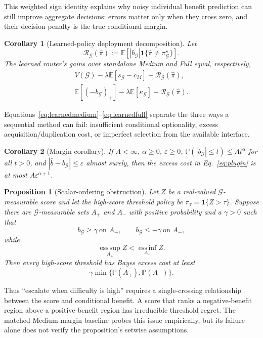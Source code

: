 \documentclass[10pt]{article}
\newtheorem{proposition}{Proposition}
\newtheorem{corollary}{Corollary}
\theoremstyle{definition}
\theoremstyle{remark}
\newcommand{\E}{\mathbb{E}}
\newcommand{\Prb}{\mathbb{P}}
\newcommand{\G}{\mathcal{G}}
\newcommand{\pos}[1]{\left(#1\right)_{+}}
\begin{document}
This weighted sign identity explains why noisy individual benefit prediction
can still improve aggregate decisions: errors matter only when they cross
zero, and their decision penalty is the true conditional margin.

\begin{corollary}[Learned-policy deployment decomposition]
\label{cor:learned}
Let
\[
 \mathcal R_{\G}(\widehat\pi)
 :=\E\!\left[
 |b_{\G}|\mathbf 1\{\widehat\pi\ne\pi^\star_{\G}\}
 \right].
\]
The learned router's gains over standalone Medium and Full equal,
respectively,
\begin{align}
 V(\G)-\lambda\E[s_{\G}-c_M]-\mathcal R_{\G}(\widehat\pi),
 \label{eq:learnedmedium}\\
 \E[\pos{-b_{\G}}]-\lambda\E[\kappa_{\G}]
 -\mathcal R_{\G}(\widehat\pi).
 \label{eq:learnedfull}
\end{align}
\end{corollary}

Equations~\eqref{eq:learnedmedium}--\eqref{eq:learnedfull} separate the three
ways a sequential method can fail: insufficient conditional optionality,
excess acquisition/duplication cost, or imperfect selection from the available
interface.

\begin{corollary}[Margin corollary]
\label{cor:margin}
If $A<\infty$, $\alpha\geq0$, $\varepsilon\geq0$,
$\Prb(|b_{\G}|\le t)\le At^\alpha$ for all $t>0$, and
$|\widehat b-b_{\G}|\le\varepsilon$ almost surely, then the excess cost in
Eq.~\eqref{eq:plugin} is at most $A\varepsilon^{\alpha+1}$.
\end{corollary}

\begin{proposition}[Scalar-ordering obstruction]
\label{prop:threshold}
Let $Z$ be a real-valued $\G$-measurable score and let the high-score
threshold policy be $\pi_\tau=\mathbf 1\{Z>\tau\}$.
Suppose there are $\G$-measurable sets $A_+$ and $A_-$ with positive
probability and a $\gamma>0$ such that
\[
 b_{\G}\geq\gamma\ \text{on }A_+,\qquad
 b_{\G}\leq-\gamma\ \text{on }A_-,
\]
while
\[
 \operatorname*{ess\,sup}_{A_+} Z
 <
 \operatorname*{ess\,inf}_{A_-} Z.
\]
Then every high-score threshold has Bayes excess cost at least
\[
 \gamma\min\{\Prb(A_+),\Prb(A_-)\}.
\]
\end{proposition}

Thus ``escalate when difficulty is high'' requires a single-crossing
relationship between the score and conditional benefit.  A score that ranks a
negative-benefit region above a positive-benefit region has irreducible
threshold regret.  The matched Medium-margin baseline probes this issue
empirically, but its failure alone does not verify the proposition's setwise
assumptions.
\end{document}
